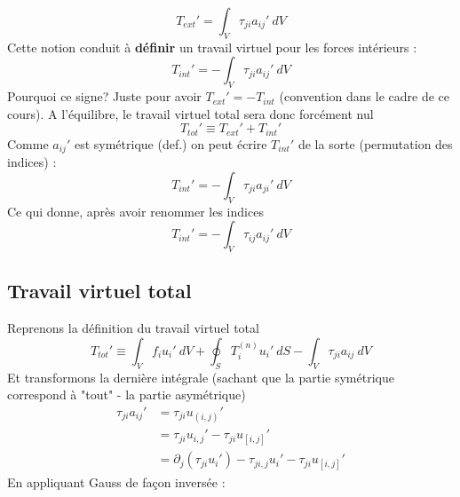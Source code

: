 	\begin{equation}
	T_{ext}' = \int_V \tau_{ji}a_{ij}'\ dV
	\end{equation}
	Cette notion conduit à \textbf{définir} un travail virtuel pour les forces 
	intérieurs :
	\begin{equation}
	T_{int}' = -\int_V\tau_{ji}a_{ij}'\ dV
	\end{equation}
	Pourquoi ce signe? Juste pour avoir $T_{ext}'=-T_{int}$ (convention dans le 
	cadre de ce cours). A l'équilibre, le travail virtuel total sera donc 
	forcément nul
	\begin{equation}
	T_{tot}' \equiv  T_{ext}'+T_{int}'
	\end{equation}
	Comme $a_{ij}'$ est symétrique (def.) on peut écrire $T_{int}'$ de la sorte 
	(permutation des indices) :
	\begin{equation}
	T_{int}' = -\int_V\tau_{ji}a_{ji}'\ dV
	\end{equation}
	Ce qui donne, après avoir renommer les indices
	\begin{equation}
	T_{int}' = -\int_V\tau_{ij}a_{ij}'\ dV
	\end{equation}
	
	\subsection{Travail virtuel total}
	Reprenons la définition du travail virtuel total
	\begin{equation}
	T_{tot}' \equiv \int_V f_iu_i'\ dV + \oint_S T_i^{(n)}u_i'\ dS - \int_V 
	\tau_{ji}a_{ij}\ dV
\end{equation}		
	Et transformons la dernière intégrale (sachant que la partie symétrique 
	correspond à "tout" - la partie asymétrique)
	\begin{equation}
	\begin{array}{ll}
	\tau_{ji}a_{ij}' &= \tau_{ji}u_{(i,j)}'\\
	&= \tau_{ji}u_{i,j}' - \tau_{ji}u_{[i,j]}'\\
	&= \partial_j(\tau_{ji}u_i')-\tau_{ji,j}u_i'-\tau_{ji}u_{[i,j]}'
	\end{array}
	\end{equation}
	En appliquant Gauss de façon inversée :\\
	
